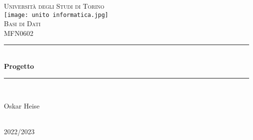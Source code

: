 \documentclass[12pt,a4paper]{article}
\begin{document}
\begin{titlepage}

\newcommand{\HRule}{\rule{\linewidth}{0.5mm}} %

\center %
 

\textsc{\LARGE Università degli Studi di Torino}\\[1.5cm] %
\texttt{[image: unito informatica.jpg]}\\[1cm] %
\textsc{\Large Basi di Dati}\\[0.5cm] %
\textsc{\large MFN0602}\\[0.5cm] %


\HRule \\[0.4cm]
{ \huge \bfseries Progetto}\\[0.4cm] %
\HRule \\[1.5cm]
 

\begin{minipage}{0.4\textwidth}
\begin{center} \large
Oskar Heise\\ %
\end{center}

\end{minipage}\\[2cm]



{\large 2022/2023}\\[2cm] %

\vfill %
\end{titlepage}

\newpage
\tableofcontents
\newpage

\newpage

\newpage

\end{document}
